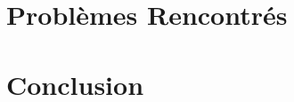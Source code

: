 	\section{Problèmes Rencontrés}
	\begin{frame}
	
	\end{frame}
	
	\section{Conclusion}
	\begin{frame}
	
	\end{frame}


